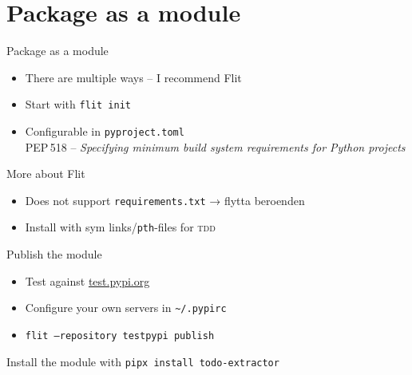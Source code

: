 \section{Package as a module}

\begin{frame}{Package as a module}
  \begin{itemize}
    \item There are multiple ways -- I recommend Flit
    \item Start with \texttt{flit init}
    \item Configurable in \texttt{pyproject.toml}\\
      PEP\,518 -- {\small\textit{Specifying minimum build system requirements for Python projects}}
  \end{itemize}
\end{frame}

\begin{frame}{More about Flit}
  \begin{itemize}
    \item Does not support \texttt{requirements.txt} → flytta beroenden
    \item Install with sym links/\texttt{pth}-files for \textsc{tdd}
  \end{itemize}
\end{frame}

\begin{frame}[fragile]{Publish the module}
  \begin{itemize}
    \item Test against \url{test.pypi.org}
    \item Configure your own servers in \texttt{\textasciitilde/.pypirc}
    \item \texttt{flit --repository testpypi publish}
  \end{itemize}

  \vfill

  Install the module with \texttt{pipx install todo-extractor}

\end{frame}
